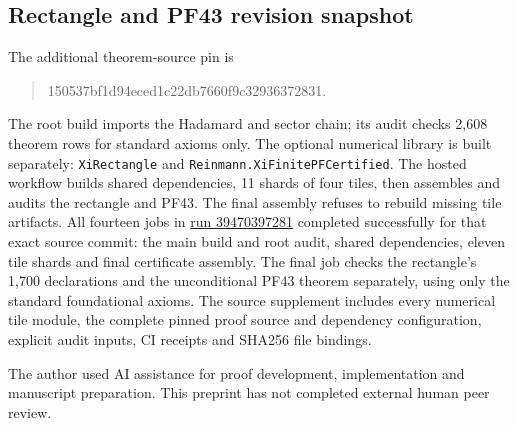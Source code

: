 \documentclass[11pt]{amsart}
\begin{document}
\subsection*{Rectangle and PF43 revision snapshot}
The additional theorem-source pin is
\begin{quote}\small\ttfamily
150537bf1d94eced1c22db7660f9c32936372831.
\end{quote}
The root build imports the Hadamard and sector chain; its audit checks
2,608 theorem rows for standard axioms only. The optional numerical library is
built separately: \texttt{XiRectangle} and
\texttt{Reinmann.XiFinitePFCertified}. The hosted workflow builds shared
dependencies, 11 shards of four tiles, then assembles and audits the rectangle
and PF43. The final assembly refuses to rebuild missing tile artifacts.
All fourteen jobs in
\href{https://github.com/sciencenerd-des/reinmann/actions/runs/39470397281}{run 39470397281}
completed successfully for that exact source commit: the main build and root
audit, shared dependencies, eleven tile shards and final certificate assembly.
The final job checks the rectangle's 1,700 declarations and the unconditional
PF43 theorem separately, using only the standard foundational axioms.
The source supplement includes every numerical tile module, the complete
pinned proof source and dependency configuration, explicit audit inputs,
CI receipts and SHA256 file bindings.

The author used AI assistance for proof development, implementation and manuscript
preparation. This preprint has not completed external human peer review.
\end{document}
